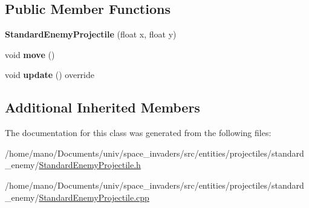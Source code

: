 \subsection*{Public Member Functions}
\begin{DoxyCompactItemize}
\item 
\mbox{\label{classentities_1_1projectiles_1_1standard__enemy_1_1StandardEnemyProjectile_abc3abd0c8b7d2ff776bf55ab04be67c3}} 
{\bfseries Standard\+Enemy\+Projectile} (float x, float y)
\item 
\mbox{\label{classentities_1_1projectiles_1_1standard__enemy_1_1StandardEnemyProjectile_a8a5890e9986800df9870c26c83950743}} 
void {\bfseries move} ()
\item 
\mbox{\label{classentities_1_1projectiles_1_1standard__enemy_1_1StandardEnemyProjectile_a9c48f6f68fddcd9d9e7c5a610eba2af8}} 
void {\bfseries update} () override
\end{DoxyCompactItemize}
\subsection*{Additional Inherited Members}


The documentation for this class was generated from the following files\+:\begin{DoxyCompactItemize}
\item 
/home/mano/\+Documents/univ/space\+\_\+invaders/src/entities/projectiles/standard\+\_\+enemy/\hyperlink{StandardEnemyProjectile_8h}{Standard\+Enemy\+Projectile.\+h}\item 
/home/mano/\+Documents/univ/space\+\_\+invaders/src/entities/projectiles/standard\+\_\+enemy/\hyperlink{StandardEnemyProjectile_8cpp}{Standard\+Enemy\+Projectile.\+cpp}\end{DoxyCompactItemize}
